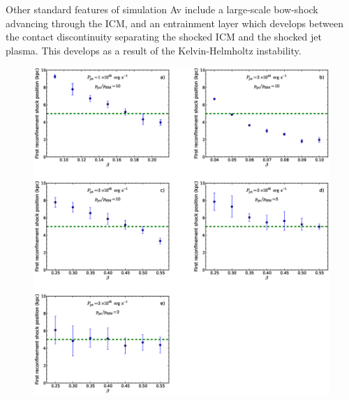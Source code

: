 Other standard features of  simulation Av include a large-scale bow-shock advancing through the ICM, and an entrainment layer which develops between the contact discontinuity separating the shocked ICM and the shocked jet plasma. This develops as a result of the Kelvin-Helmholtz instability. 





%
%


\begin{figure}
\includegraphics[width=\textwidth]{pps.eps}

\end{figure}
